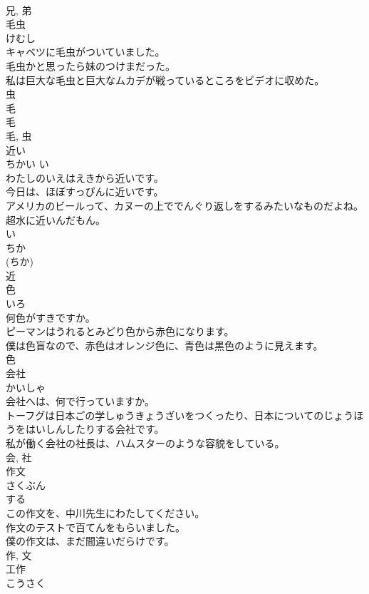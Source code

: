 \documentclass[8pt]{extreport}
\begin{document}
\begin{CJK}{UTF8}{min}
\\	兄, 弟	
\\	毛虫	
\\	けむし	
\\	キャベツに毛虫がついていました。	
\\	毛虫かと思ったら妹のつけまだった。	
\\	私は巨大な毛虫と巨大なムカデが戦っているところをビデオに収めた。	
\\	虫 
\\	毛 
\\	毛 
\\	毛, 虫	
\\	近い	
\\	ちかい	い 
\\	わたしのいえはえきから近いです。	
\\	今日は、ほぼすっぴんに近いです。	
\\	アメリカのビールって、カヌーの上ででんぐり返しをするみたいなものだよね。超水に近いんだもん。	
\\	い 
\\	ちか 
\\	(ちか) 
\\	近	
\\	色	
\\	いろ	
\\	何色がすきですか。	
\\	ピーマンはうれるとみどり色から赤色になります。	
\\	僕は色盲なので、赤色はオレンジ色に、青色は黒色のように見えます。	
\\	色	
\\	会社	
\\	かいしゃ	
\\	会社へは、何で行っていますか。	
\\	トーフグは日本ごの学しゅうきょうざいをつくったり、日本についてのじょうほうをはいしんしたりする会社です。	
\\	私が働く会社の社長は、ハムスターのような容貌をしている。	
\\	会, 社	
\\	作文	
\\	さくぶん	
\\	する 
\\	この作文を、中川先生にわたしてください。	
\\	作文のテストで百てんをもらいました。	
\\	僕の作文は、まだ間違いだらけです。	
\\	作, 文	
\\	工作	
\\	こうさく	

\end{CJK}
\end{document}
